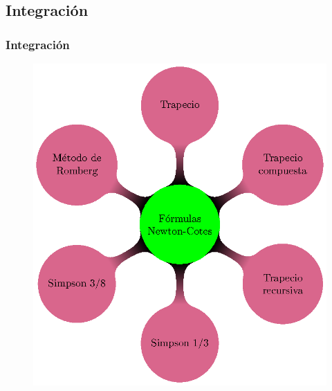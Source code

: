 \subsection*{Integración}
\begin{frame}[fragile]
\frametitle{Integración}
\begin{figure}
    \centering
    \includegraphics[scale=0.6]{Imagenes/MapaMental_Tema2_04.eps}
\end{figure}
\end{frame}
